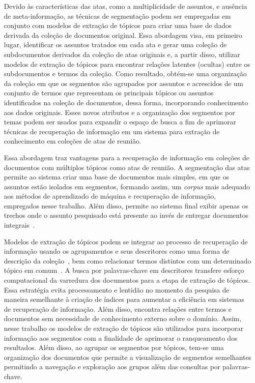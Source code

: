 Devido às características das atas, como a multiplicidade de assuntos, e ausência de meta-informação, as técnicas de segmentação podem ser empregadas em conjunto com modelos de extração de tópicos para criar uma base de dados derivada da coleção de documentos original. 
Essa abordagem visa, em primeiro lugar, identificar os assuntos tratados em cada ata e gerar uma coleção de subdocumentos derivados da coleção de atas originais e, a partir disso, utilizar modelos de extração de tópicos para encontrar relações latentes (ocultas) entre os subdocumentos e termos da coleção.
Como resultado, obtém-se uma organização da coleção em que os segmentos são agrupados por assuntos e acrescidos de um conjunto de termos que representam os principais tópicos ou assuntos identificados na coleção de documentos, dessa forma, incorporando conhecimento aos dados originais. Esses novos atributos e a organização dos segmentos por temas podem ser usados para 
expandir o espaço de busca a fim de aprimorar técnicas de recuperação de informação em um sistema para extração de conhecimento em coleções de atas de reunião.




Essa abordagem traz vantagens para a recuperação de informação em coleções de documentos com múltiplos tópicos como atas de reunião.
A segmentação das atas permite ao sistema criar uma base de documentos mais simples, em que os assuntos estão isolados em segmentos, formando assim, um \textit{corpus} mais adequado aos métodos de aprendizado de máquina e recuperação de informação, empregados nesse trabalho. Além disso, permite ao sistema final exibir apenas os trechos onde o assunto pesquisado está presente ao invés de entregar documentos integrais~\cite{Tagarelli2013, Jeong:2010, Prince2007, Huang2003}. 

Modelos de extração de tópicos podem se integrar ao processo de recuperação de informação usando os agrupamentos e seus descritores como uma forma de descrição da coleção~\cite{Zhai2017, Xing2009}, bem como relacionar termos distintos com um determinado tópico em comum~\cite{WEIXING}. A busca por palavras-chave em descritores transfere esforço computacional da varredura dos documentos para a etapa de extração de tópicos. Essa estratégia evita processamento e lentidão no momento da pesquisa de maneira semelhante à criação de índices para aumentar a eficiência em sistemas de recuperação de informação. Além disso, encontra relações entre termos e documentos sem necessidade de conhecimento externo sobre o domínio. Assim, nesse trabalho os modelos de extração de tópicos são utilizados para incorporar informação aos segmentos com a finalidade de aprimorar o ranqueamento dos resultados. 
% 
Além disso, ao agrupar os segmentos por tópicos, tem-se uma organização dos documentos que permite a visualização de segmentos semelhantes permitindo a navegação e exploração aos grupos além das consultas por palavras-chave.
%


